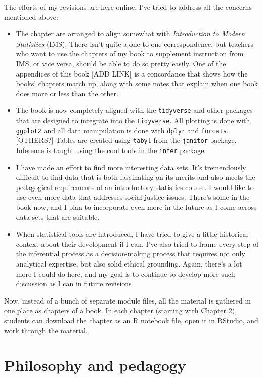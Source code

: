 \documentclass[
]{book}
\providecommand{\tightlist}{%
  \setlength{\itemsep}{0pt}\setlength{\parskip}{0pt}}
\begin{document}
The efforts of my revisions are here online. I've tried to address all the concerns mentioned above:

\begin{itemize}
\tightlist
\item
  The chapter are arranged to align somewhat with \emph{Introduction to Modern Statistics} (IMS). There isn't quite a one-to-one correspondence, but teachers who want to use the chapters of my book to supplement instruction from IMS, or vice versa, should be able to do so pretty easily. One of the appendices of this book {[}ADD LINK{]} is a concordance that shows how the books' chapters match up, along with some notes that explain when one book does more or less than the other.
\item
  The book is now completely aligned with the \texttt{tidyverse} and other packages that are designed to integrate into the \texttt{tidyverse}. All plotting is done with \texttt{ggplot2} and all data manipulation is done with \texttt{dplyr} and \texttt{forcats}. {[}OTHERS?{]} Tables are created using \texttt{tabyl} from the \texttt{janitor} package. Inference is taught using the cool tools in the \texttt{infer} package.
\item
  I have made an effort to find more interesting data sets. It's tremendously difficult to find data that is both fascinating on its merits and also meets the pedagogical requirements of an introductory statistics course. I would like to use even more data that addresses social justice issues. There's some in the book now, and I plan to incorporate even more in the future as I come across data sets that are suitable.
\item
  When statistical tools are introduced, I have tried to give a little historical context about their development if I can. I've also tried to frame every step of the inferential process as a decision-making process that requires not only analytical expertise, but also solid ethical grounding. Again, there's a lot more I could do here, and my goal is to continue to develop more such discussion as I can in future revisions.
\end{itemize}

Now, instead of a bunch of separate module files, all the material is gathered in one place as chapters of a book. In each chapter (starting with Chapter 2), students can download the chapter as an R notebook file, open it in RStudio, and work through the material.

\hypertarget{intro-philosophy}{%
\section*{Philosophy and pedagogy}\label{intro-philosophy}}
\end{document}

